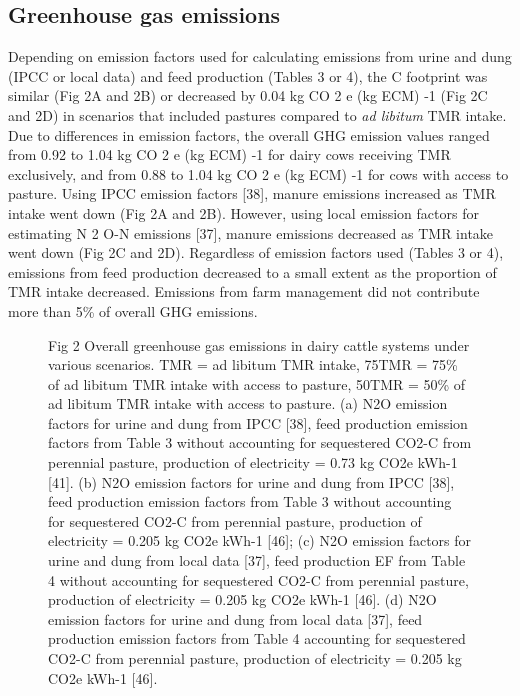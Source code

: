 \documentclass[11pt,a4paper]{article}
\begin{document}
\subsection{Greenhouse gas emissions}

Depending on emission factors used for calculating emissions from urine and dung (IPCC or local data) and feed production (Tables 3 or 4), the C footprint was similar (Fig 2A and 2B) or decreased by 0.04 kg CO 2 e (kg ECM) -1 (Fig 2C and 2D) in scenarios that included pastures compared to \textit{ad libitum} TMR intake. Due to differences in emission factors, the overall GHG emission values ranged from 0.92 to 1.04 kg CO 2 e (kg ECM) -1 for dairy cows receiving TMR exclusively, and from 0.88 to 1.04 kg CO 2 e (kg ECM) -1 for cows with access to pasture. Using IPCC emission factors [38], manure emissions increased as TMR intake went down (Fig 2A and 2B). However, using local emission factors for estimating N 2 O-N emissions [37], manure emissions decreased as TMR intake went down (Fig 2C and 2D). Regardless of emission factors used (Tables 3 or 4), emissions from feed production decreased to a small extent as the proportion of TMR intake decreased. Emissions from farm management did not contribute more than 5\% of overall GHG emissions.

\begin{figure}[h]
\caption{Fig 2 Overall greenhouse gas emissions in dairy cattle systems under various scenarios. TMR = ad libitum TMR intake, 75TMR = 75\% of ad libitum TMR intake with access to pasture, 50TMR = 50\% of ad libitum TMR intake with access to pasture. (a) N2O emission factors for urine and dung from IPCC [38], feed production emission factors from Table 3 without accounting for sequestered CO2-C from perennial pasture, production of electricity = 0.73 kg CO2e kWh-1 [41]. (b) N2O emission factors for urine and dung from IPCC [38], feed production emission factors from Table 3 without accounting for sequestered CO2-C from perennial pasture, production of electricity = 0.205 kg CO2e kWh-1 [46]; (c) N2O emission factors for urine and dung from local data [37], feed production EF from Table 4 without accounting for sequestered CO2-C from perennial pasture, production of electricity = 0.205 kg CO2e kWh-1 [46]. (d) N2O emission factors for urine and dung from local data [37], feed production emission factors from Table 4 accounting for sequestered CO2-C from perennial pasture, production of electricity = 0.205 kg CO2e kWh-1 [46].}
\end{figure}
\end{document}
